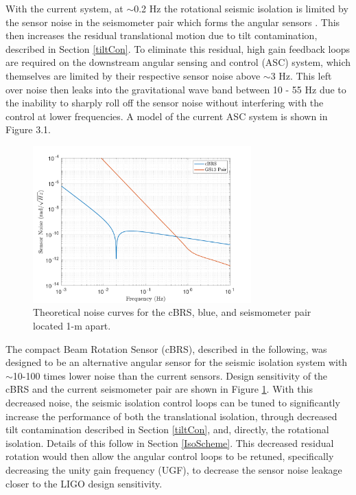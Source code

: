 \documentclass [12pt, proquest]{uwthesis}[2019]
\begin{document}
With the current system, at $\sim$0.2 Hz the rotational seismic isolation is limited by the sensor noise in the seismometer pair which forms the angular sensors \cite{windproofing}. This then increases the residual translational motion due to tilt contamination, described in Section \ref{tiltCon}. To eliminate this residual, high gain feedback loops are required on the downstream angular sensing and control (ASC) system, which themselves are limited by their respective sensor noise above $\sim$3 Hz. This left over noise then leaks into the gravitational wave band between 10 - 55 Hz due to the inability to sharply roll off the sensor noise without interfering with the control at lower frequencies. A model of the current ASC system is shown in Figure 3.1.

\begin{figure}[!h]
\begin{center}
\includegraphics[width=0.75\textwidth]{sensorNoise.pdf}
\caption[Theoretical noise curves for the cBRS and seismometer pair]{Theoretical noise curves for the cBRS, blue, and seismometer pair located 1-m apart.}
\label{sensNoise}
\end{center}
\end{figure}


The compact Beam Rotation Sensor (cBRS), described in the following, was designed to be an alternative angular sensor for the seismic isolation system with $\sim$10-100 times lower noise than the current sensors. Design sensitivity of the cBRS and the current seismometer pair are shown in Figure \ref{sensNoise}. With this decreased noise, the seismic isolation control loops can be tuned to significantly increase the performance of both the translational isolation, through decreased tilt contamination described in Section \ref{tiltCon}, and, directly, the rotational isolation. Details of this follow in Section \ref{IsoScheme}. This decreased residual rotation would then allow the angular control loops to be retuned, specifically decreasing the unity gain frequency (UGF), to decrease the sensor noise leakage closer to the LIGO design sensitivity.
\end{document}
